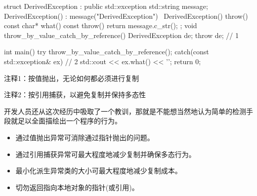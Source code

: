 
\begin{cpp}
struct DerivedException : public std::exception {
  std::string message;
  DerivedException() : message("DerivedException") {}
  ~DerivedException() throw() {}
  const char* what() const throw() { return message.c_str(); }
};
void throw_by_value_catch_by_reference() {
  DerivedException de;
  throw de; // 1
}

int main() {
  try {
    throw_by_value_catch_by_reference();
  } catch(const std::exception& ex) { // 2
    std::cout << ex.what() << '\n';
  }
  return 0;
}
\end{cpp}

{\footnotesize
注释1：按值抛出，无论如何都必须进行复制

注释2：按引用捕获，以避免复制并保持多态性
}

开发人员还从这次经历中吸取了一个教训，那就是不能想当然地认为简单的检测手段就足以全面描绘出一个程序的行为。


\begin{itemize}
\item
通过值抛出异常可消除通过指针抛出的问题。

\item
通过引用捕获异常可最大程度地减少复制并确保多态行为。

\item
最小化派生异常类的大小可最大程度地减少复制成本。

\item
切勿返回指向本地对象的指针(或引用)。
\end{itemize}
